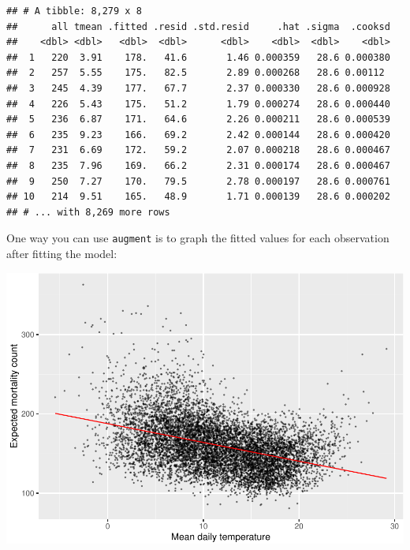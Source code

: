 \documentclass[
]{book}
\newenvironment{Shaded}{\begin{snugshade}}{\end{snugshade}}
\newcommand{\DataTypeTok}[1]{\textcolor[rgb]{0.13,0.29,0.53}{#1}}
\newcommand{\FloatTok}[1]{\textcolor[rgb]{0.00,0.00,0.81}{#1}}
\newcommand{\KeywordTok}[1]{\textcolor[rgb]{0.13,0.29,0.53}{\textbf{#1}}}
\newcommand{\NormalTok}[1]{#1}
\newcommand{\OperatorTok}[1]{\textcolor[rgb]{0.81,0.36,0.00}{\textbf{#1}}}
\newcommand{\StringTok}[1]{\textcolor[rgb]{0.31,0.60,0.02}{#1}}
\begin{document}
\begin{verbatim}
## # A tibble: 8,279 x 8
##      all tmean .fitted .resid .std.resid     .hat .sigma  .cooksd
##    <dbl> <dbl>   <dbl>  <dbl>      <dbl>    <dbl>  <dbl>    <dbl>
##  1   220  3.91    178.   41.6       1.46 0.000359   28.6 0.000380
##  2   257  5.55    175.   82.5       2.89 0.000268   28.6 0.00112 
##  3   245  4.39    177.   67.7       2.37 0.000330   28.6 0.000928
##  4   226  5.43    175.   51.2       1.79 0.000274   28.6 0.000440
##  5   236  6.87    171.   64.6       2.26 0.000211   28.6 0.000539
##  6   235  9.23    166.   69.2       2.42 0.000144   28.6 0.000420
##  7   231  6.69    172.   59.2       2.07 0.000218   28.6 0.000467
##  8   235  7.96    169.   66.2       2.31 0.000174   28.6 0.000467
##  9   250  7.27    170.   79.5       2.78 0.000197   28.6 0.000761
## 10   214  9.51    165.   48.9       1.71 0.000139   28.6 0.000202
## # ... with 8,269 more rows
\end{verbatim}

One way you can use \texttt{augment} is to graph the fitted values for each observation
after fitting the model:

\begin{Shaded}
\end{Shaded}

\includegraphics{adv_epi_analysis_files/figure-latex/unnamed-chunk-29-1.pdf}
\end{document}
